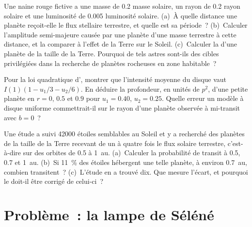 \begin{exercise}[$\star\star\star$]\label{exo:b3:exoplanets:10}
Une naine rouge fictive a une masse de 0.2 masse solaire, un rayon de 0.2 rayon
solaire et une luminosité de \num{0.005} luminosité solaire. (a)~À quelle distance
une planète reçoit-elle le flux stellaire terrestre, et quelle est sa période~?
(b)~Calculer l'amplitude semi-majeure causée par une planète d'une masse terrestre
à cette distance, et la comparer à l'effet de la Terre sur le Soleil. (c)~Calculer la
 d'une planète de la taille de la Terre. Pourquoi de tels
astres sont-ils des cibles privilégiées dans la recherche de planètes rocheuses en zone habitable~?
\end{exercise}

\begin{exercise}[$\star\star\star$]\label{exo:b3:exoplanets:11}
Pour la loi quadratique d', montrer que l'intensité
moyenne du disque vaut $I(1)(1 - u_1/3 - u_2/6)$. En déduire la profondeur, en unités
de $p^2$, d'une petite planète en $r = 0$, $0.5$ et $0.9$ pour $u_1 = 0.40$,
$u_2 = 0.25$. Quelle erreur un modèle à disque uniforme commettrait-il sur le rayon
d'une planète observée à mi-transit avec $b = 0$~?
\end{exercise}

\begin{exercise}[$\star\star\star$]\label{exo:b3:exoplanets:12}
Une étude a suivi \num{42000} étoiles semblables au Soleil et y a recherché des planètes
de la taille de la Terre recevant de un à quatre fois le flux solaire terrestre,
c'est-à-dire sur des orbites de 0.5 à \qty{1}{au}. (a)~Calculer la probabilité de
transit à 0.5, 0.7 et \qty{1}{au}. (b)~Si \qty{11}{\percent} des étoiles
hébergent une telle planète, à environ \qty{0.7}{au}, combien transitent~?
(c)~L'étude en a trouvé dix. Que mesure l'écart, et pourquoi le 
doit-il être corrigé de celui-ci~?
\end{exercise}

\section{Problème~: la lampe de Séléné}

